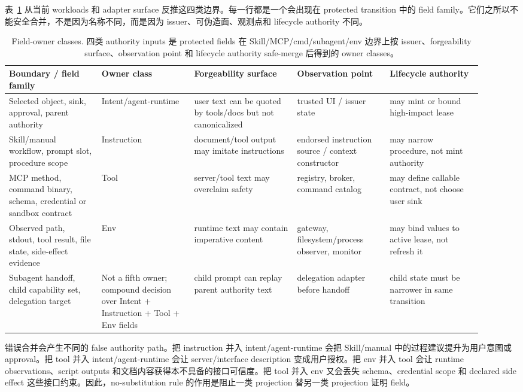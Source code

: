 \documentclass[UTF8,a4paper,11pt]{ctexart}
\begin{document}
表~\ref{tab:boundary-owner-classes} 从当前 workloads 和 adapter surface 反推这四类边界。每一行都是一个会出现在 protected transition 中的 field family。它们之所以不能安全合并，不是因为名称不同，而是因为 issuer、可伪造面、观测点和 lifecycle authority 不同。

\begin{table}[t]
\centering
\tiny
\setlength{\tabcolsep}{1.5pt}
\caption{Field-owner classes. 四类 authority inputs 是 protected fields 在 Skill/MCP/cmd/subagent/env 边界上按 issuer、forgeability surface、observation point 和 lifecycle authority safe-merge 后得到的 owner classes。}
\label{tab:boundary-owner-classes}
\begin{tabular}{p{0.18\linewidth}p{0.18\linewidth}p{0.20\linewidth}p{0.18\linewidth}p{0.18\linewidth}}
\toprule
Boundary / field family & Owner class & Forgeability surface & Observation point & Lifecycle authority \\
\midrule
Selected object, sink, approval, parent authority & Intent/agent-runtime & user text can be quoted by tools/docs but not canonicalized & trusted UI / issuer state & may mint or bound high-impact lease \\
Skill/manual workflow, prompt slot, procedure scope & Instruction & document/tool output may imitate instructions & endorsed instruction source / context constructor & may narrow procedure, not mint authority \\
MCP method, command binary, schema, credential or sandbox contract & Tool & server/tool text may overclaim safety & registry, broker, command catalog & may define callable contract, not choose user sink \\
Observed path, stdout, tool result, file state, side-effect evidence & Env & runtime text may contain imperative content & gateway, filesystem/process observer, monitor & may bind values to active lease, not refresh it \\
Subagent handoff, child capability set, delegation target & Not a fifth owner; compound decision over Intent + Instruction + Tool + Env fields & child prompt can replay parent authority text & delegation adapter before handoff & child state must be narrower in same transition \\
\bottomrule
\end{tabular}
\end{table}

错误合并会产生不同的 false authority path。把 instruction 并入 intent/agent-runtime 会把 Skill/manual 中的过程建议提升为用户意图或 approval。把 tool 并入 intent/agent-runtime 会让 server/interface description 变成用户授权。把 env 并入 tool 会让 runtime observations、script outputs 和文档内容获得本不具备的接口可信度。把 tool 并入 env 又会丢失 schema、credential scope 和 declared side effect 这些接口约束。因此，no-substitution rule 的作用是阻止一类 projection 替另一类 projection 证明 field。
\end{document}
